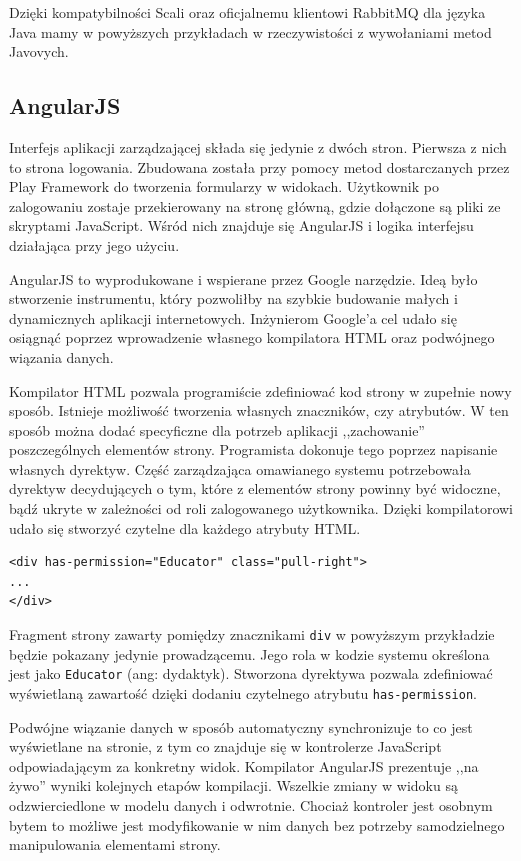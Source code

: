 \documentclass[brudnopis]{xmgr}
\begin{document}
Dzięki kompatybilności Scali oraz oficjalnemu klientowi RabbitMQ dla języka Java mamy w powyższych przykładach w rzeczywistości z wywołaniami metod Javovych.

\subsection{AngularJS}

Interfejs aplikacji zarządzającej składa się jedynie z dwóch stron. Pierwsza z nich to strona logowania. Zbudowana została przy pomocy metod dostarczanych przez Play Framework do tworzenia formularzy w widokach. Użytkownik po zalogowaniu zostaje przekierowany na stronę główną, gdzie dołączone są pliki ze skryptami JavaScript. Wśród nich znajduje się AngularJS i logika interfejsu działająca przy jego użyciu.

AngularJS to wyprodukowane i wspierane przez Google narzędzie. Ideą było stworzenie instrumentu, który pozwoliłby na szybkie budowanie małych i dynamicznych aplikacji internetowych. Inżynierom Google'a cel udało się osiągnąć poprzez wprowadzenie własnego kompilatora HTML oraz podwójnego wiązania danych.

Kompilator HTML pozwala programiście zdefiniować kod strony w zupełnie nowy sposób. Istnieje możliwość tworzenia własnych znaczników, czy atrybutów. W ten sposób można dodać specyficzne dla potrzeb aplikacji ,,zachowanie'' poszczególnych elementów strony. Programista dokonuje tego poprzez napisanie własnych dyrektyw. Część zarządzająca omawianego systemu potrzebowała dyrektyw decydujących o tym, które z elementów strony powinny być widoczne, bądź ukryte w zależności od roli zalogowanego użytkownika. Dzięki kompilatorowi udało się stworzyć czytelne dla każdego atrybuty HTML.

\begin{verbatim}
<div has-permission="Educator" class="pull-right">
...
</div>
\end{verbatim}

Fragment strony zawarty pomiędzy znacznikami \texttt{div} w powyższym przykładzie będzie pokazany jedynie prowadzącemu. Jego rola w kodzie systemu określona jest jako \texttt{Educator} (ang: dydaktyk). Stworzona dyrektywa pozwala zdefiniować wyświetlaną zawartość dzięki dodaniu czytelnego atrybutu \texttt{has-permission}.

Podwójne wiązanie danych w sposób automatyczny synchronizuje to co jest wyświetlane na stronie, z tym co znajduje się w kontrolerze JavaScript odpowiadającym za konkretny widok. Kompilator AngularJS prezentuje ,,na żywo'' wyniki kolejnych etapów kompilacji. Wszelkie zmiany w widoku są odzwierciedlone w modelu danych i odwrotnie. Chociaż kontroler jest osobnym bytem to możliwe jest modyfikowanie w nim danych bez potrzeby samodzielnego manipulowania elementami strony.  
\end{document}
